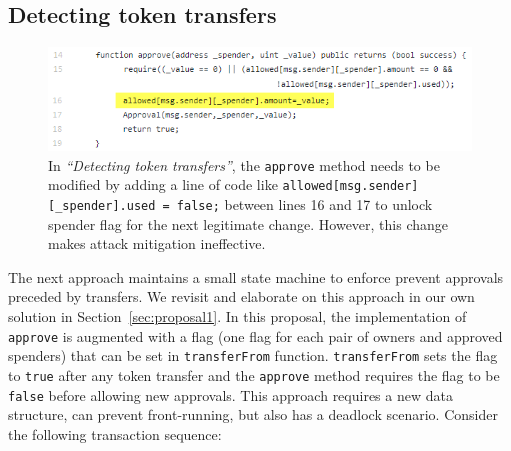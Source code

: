 


\subsection{Detecting token transfers}

\begin{figure}[t]
	\centering
	\includegraphics[width=1.0\linewidth]{figures/multiple_withdrawal_33.png}
	\caption{In \textit{``Detecting token transfers''}, the \texttt{approve} method needs to be modified by adding a line of code like \texttt{allowed[msg.sender][\_spender].used = false;} between lines 16 and 17 to unlock spender flag for the next legitimate change. However, this change makes attack mitigation ineffective.\label{fig:det}}
\end{figure}

The next approach \cite{Ref17} maintains a small state machine to enforce prevent approvals preceded by transfers. We revisit and elaborate on this approach in our own solution in Section~\ref{sec:proposal1}. In this proposal, the implementation of \texttt{approve} is augmented with a flag (one flag for each pair of owners and approved spenders) that can be set in \texttt{transferFrom} function. \texttt{transferFrom} sets the flag to \texttt{true} after any token transfer and the \texttt{approve} method requires the flag to be \texttt{false} before allowing new approvals. This approach requires a new data structure, can prevent front-running, but also has a deadlock scenario. Consider the following transaction sequence:

